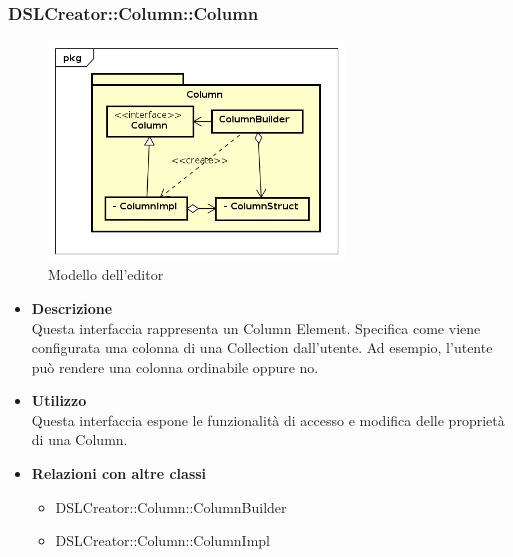  \subsubsection{DSLCreator::Column::Column}
                 \begin{figure}[H]
                  \centering
                  \includegraphics[width=0.7\textwidth]{res/img/Column.png}
                  \caption{Modello dell'editor}
                  \label{fig:diagram_model}
                \end{figure}
                    \begin{itemize}
                        \item \textbf{Descrizione} \hfill \\
                          Questa interfaccia rappresenta un Column Element. Specifica come viene configurata una colonna di una Collection dall'utente. Ad esempio, l'utente può rendere una colonna ordinabile oppure no.
                        \item \textbf{Utilizzo} \hfill \\
                          Questa interfaccia espone le funzionalità di accesso e modifica delle proprietà di una Column.
                        \item \textbf{Relazioni con altre classi}
                            \begin{itemize}
                              \item DSLCreator::Column::ColumnBuilder
                              \item DSLCreator::Column::ColumnImpl
                            \end{itemize}
                    \end{itemize}  


